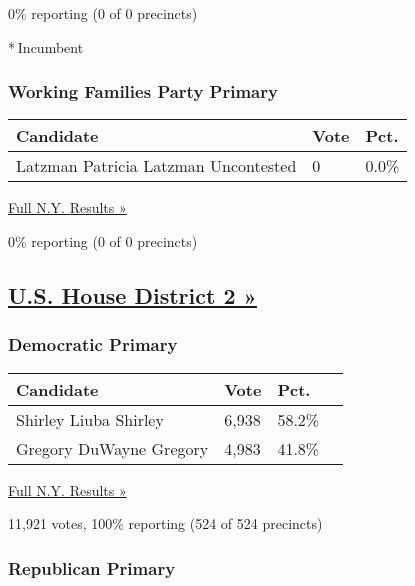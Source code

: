0\% reporting (0 of 0 precincts)

* Incumbent

\hypertarget{working-families-party-primary}{%
\subsubsection{Working Families Party
Primary}\label{working-families-party-primary}}

\begin{longtable}[]{@{}lll@{}}
\toprule
Candidate & Vote & Pct.\tabularnewline
\midrule
\endhead
 Latzman Patricia Latzman Uncontested & 0 & 0.0\%\tabularnewline
\bottomrule
\end{longtable}

\href{https://www.nytimes3xbfgragh.onion/elections/results/new-york}{Full
N.Y. Results »}

0\% reporting (0 of 0 precincts)

\hypertarget{us-house-district-2-}{%
\subsection{\texorpdfstring{\href{https://www.nytimes3xbfgragh.onion/elections/results/new-york-house-district-2-primary-election}{U.S.
House District 2
»}}{U.S. House District 2 »}}\label{us-house-district-2-}}

\hypertarget{democratic-primary-2}{%
\subsubsection{Democratic Primary}\label{democratic-primary-2}}

\begin{longtable}[]{@{}llll@{}}
\toprule
Candidate & Vote & Pct. &\tabularnewline
\midrule
\endhead
 Shirley Liuba Shirley & 6,938 & 58.2\% &\tabularnewline
 Gregory DuWayne Gregory & 4,983 & 41.8\% &\tabularnewline
\bottomrule
\end{longtable}

\href{https://www.nytimes3xbfgragh.onion/elections/results/new-york}{Full
N.Y. Results »}

11,921 votes, 100\% reporting (524 of 524 precincts)

\hypertarget{republican-primary-2}{%
\subsubsection{Republican Primary}\label{republican-primary-2}}


